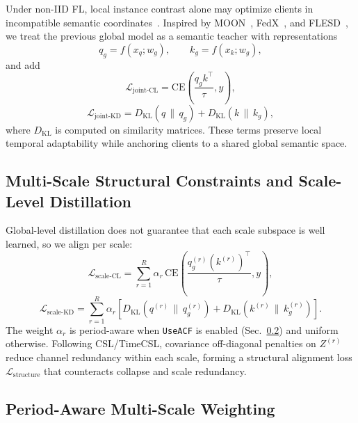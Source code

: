 \documentclass[sigconf]{acmart}
\begin{document}
Under non-IID FL, local instance contrast alone may optimize clients in
incompatible semantic coordinates~\cite{fedu2}. Inspired by MOON~\cite{moon},
FedX~\cite{fedx}, and FLESD~\cite{flesd}, we treat the previous global model as a
semantic teacher with representations
\begin{equation}
q_g = f(x_q; w_g),\qquad k_g = f(x_k; w_g),
\end{equation}
and add
\begin{equation}
\mathcal{L}_{\text{joint-CL}} = \mathrm{CE}\!\left(\frac{q_gk^\top}{\tau}, y\right),
\end{equation}
\begin{equation}
\mathcal{L}_{\text{joint-KD}} = D_{\mathrm{KL}}(q \,\|\, q_g) + D_{\mathrm{KL}}(k \,\|\, k_g),
\end{equation}
where $D_{\mathrm{KL}}$ is computed on similarity matrices. These terms preserve
local temporal adaptability while anchoring clients to a shared global semantic
space.

\subsection{Multi-Scale Structural Constraints and Scale-Level Distillation}
\label{sec:scale-constr}

Global-level distillation does not guarantee that each scale subspace is well
learned, so we align per scale:
\begin{equation}
\mathcal{L}_{\text{scale-CL}} = \sum_{r=1}^{R}\alpha_r \,
\mathrm{CE}\!\left(\frac{q_g^{(r)}(k^{(r)})^\top}{\tau}, y\right),
\label{eq:scale-cl}
\end{equation}
\begin{equation}
\mathcal{L}_{\text{scale-KD}} = \sum_{r=1}^{R}\alpha_r \left[
D_{\mathrm{KL}}\!\left(q^{(r)} \,\|\, q_g^{(r)}\right)+
D_{\mathrm{KL}}\!\left(k^{(r)} \,\|\, k_g^{(r)}\right)\right].
\end{equation}
The weight $\alpha_r$ is period-aware when \texttt{UseACF} is enabled
(Sec.~\ref{sec:period-score}) and uniform otherwise. Following CSL/TimeCSL,
covariance off-diagonal penalties on $Z^{(r)}$ reduce channel redundancy within
each scale, forming a structural alignment loss
$\mathcal{L}_{\text{structure}}$ that counteracts collapse and scale redundancy.

\subsection{Period-Aware Multi-Scale Weighting}
\label{sec:period-score}
\end{document}
